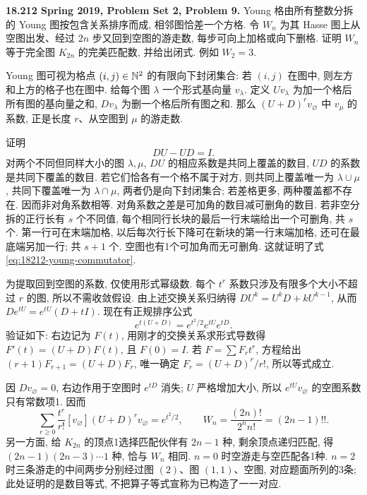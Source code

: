 \begin{exercise}\label{mit:18212-pset2-q9}
\textbf{18.212 Spring 2019, Problem Set 2, Problem 9.}
Young 格由所有整数分拆的 Young 图按包含关系排序而成, 相邻图恰差一个方格. 令 $W_n$ 为其 Hasse 图上从空图出发、经过 $2n$ 步又回到空图的游走数, 每步可向上加格或向下删格. 证明 $W_n$ 等于完全图 $K_{2n}$ 的完美匹配数, 并给出闭式. 例如 $W_2=3$.
\end{exercise}
\begin{solution}
Young 图可视为格点 $(i,j)\in\mathbb N^2$ 的有限向下封闭集合: 若 $(i,j)$ 在图中, 则左方和上方的格子也在图中. 给每个图 $\lambda$ 一个形式基向量 $v_\lambda$. 定义 $U v_\lambda$ 为加一个格后所有图的基向量之和, $D v_\lambda$ 为删一个格后所有图之和. 那么 $(U+D)^r v_\varnothing$ 中 $v_\mu$ 的系数, 正是长度 $r$、从空图到 $\mu$ 的游走数.

证明
\begin{equation}\label{eq:18212-young-commutator}
 DU-UD=I.
\end{equation}
对两个不同但同样大小的图 $\lambda,\mu$, $DU$ 的相应系数是共同上覆盖的数目, $UD$ 的系数是共同下覆盖的数目. 若它们恰各有一个格不属于对方, 则共同上覆盖唯一为 $\lambda\cup\mu$, 共同下覆盖唯一为 $\lambda\cap\mu$, 两者仍是向下封闭集合; 若差格更多, 两种覆盖都不存在. 因而非对角系数相等. 对角系数之差是可加角的数目减可删角的数目. 若非空分拆的正行长有 $s$ 个不同值, 每个相同行长块的最后一行末端给出一个可删角, 共 $s$ 个. 第一行可在末端加格, 以后每次行长下降可在新块的第一行末端加格, 还可在最底端另加一行; 共 $s+1$ 个. 空图也有1个可加角而无可删角. 这就证明了式\eqref{eq:18212-young-commutator}.

为提取回到空图的系数, 仅使用形式幂级数. 每个 $t^r$ 系数只涉及有限多个大小不超过 $r$ 的图, 所以不需收敛假设. 由上述交换关系归纳得
$DU^k=U^kD+kU^{k-1}$, 从而
$D e^{tU}=e^{tU}(D+tI)$. 现在有正规排序公式
\[
 e^{t(U+D)}=e^{t^2/2}e^{tU}e^{tD}.
\]
验证如下: 右边记为 $F(t)$, 用刚才的交换关系求形式导数得
$F'(t)=(U+D)F(t)$, 且 $F(0)=I$. 若 $F=\sum F_r t^r$, 方程给出 $(r+1)F_{r+1}=(U+D)F_r$, 唯一确定 $F_r=(U+D)^r/r!$, 所以等式成立.

因 $Dv_\varnothing=0$, 右边作用于空图时 $e^{tD}$ 消失; $U$ 严格增加大小, 所以 $e^{tU}v_\varnothing$ 的空图系数只有常数项1. 因而
\[
 \sum_{r\ge0}\frac{t^r}{r!}
     [v_\varnothing](U+D)^r v_\varnothing
       =e^{t^2/2},\qquad
 W_n=\frac{(2n)!}{2^n n!}=(2n-1)!!.
\]
另一方面, 给 $K_{2n}$ 的顶点1选择匹配伙伴有 $2n-1$ 种, 剩余顶点递归匹配, 得 $(2n-1)(2n-3)\cdots1$ 种, 恰与 $W_n$ 相同. $n=0$ 时空游走与空匹配各1种. $n=2$ 时三条游走的中间两步分别经过图 $(2)$、图 $(1,1)$、空图, 对应题面所列的3条; 此处证明的是数目等式, 不把算子等式宣称为已构造了一一对应.
\end{solution}

